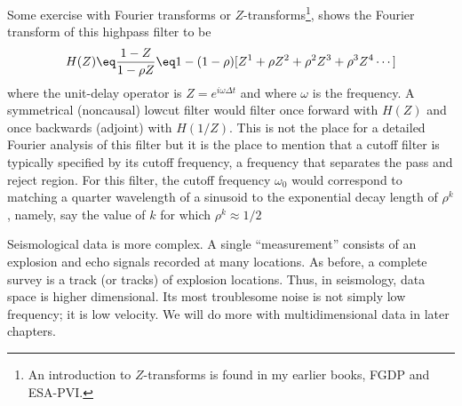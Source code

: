 \par
Some exercise with Fourier transforms
or $Z$-transforms\footnote{
        An introduction to $Z$-transforms is found in my
        earlier books, FGDP and ESA-PVI.
        },
shows the
Fourier transform of this highpass filter 
to be
\begin{equation}
H(Z) \eq \frac{1-Z }{ 1-\rho Z}
\eq
1
-(1-\rho) [
Z^1
+\rho    Z^2
+\rho^2  Z^3
+\rho^3  Z^4
\cdots
]
\label{eqn:lowcut}
\end{equation}
where the unit-delay operator is $Z=e^{i\omega\Delta t}$
and where $\omega$ is the frequency.
A symmetrical (noncausal) lowcut filter would filter once forward
with $H(Z)$ and once backwards (adjoint) with $H(1/Z)$.
This is not the place for a detailed Fourier analysis of this filter
but it is the place to mention that a cutoff filter is typically
specified by its cutoff frequency,
a frequency that separates the pass and reject region.
For this filter, the cutoff frequency $\omega_0$
would correspond to matching a quarter wavelength of a sinusoid
to the exponential decay length of $\rho^k$, namely,
say the value of $k$ for which $\rho^k \approx 1/2$

\par
Seismological data is more complex.  A single ``measurement''
consists of an explosion and echo signals recorded at many locations.
As before, a complete survey is a track (or tracks)
of explosion locations.
Thus, in seismology, data space is higher dimensional.
Its most troublesome noise is not simply low frequency;
it is low velocity.
We will do more with multidimensional data in later chapters.




